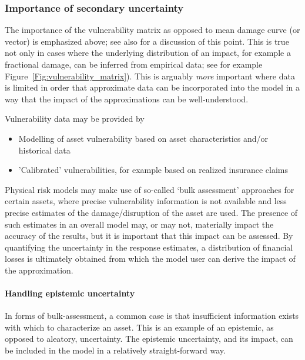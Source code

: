 \documentclass[a4paper,11pt]{extarticle} %
\begin{document}
\subsubsection{Importance of secondary uncertainty}
The importance of the vulnerability matrix as opposed to mean damage curve (or vector) is emphasized above; see also \cite{Taylor:2015} for a discussion of this point. This is true not only in cases where the underlying distribution of an impact, for example a fractional damage, can be inferred from empirical data; see for example Figure~\ref{Fig:vulnerability_matrix}). This is arguably \emph{more} important where data is limited in order that approximate data can be incorporated into the model in a way that the impact of the approximations can be well-understood. 

Vulnerability data may be provided by
\begin{itemize}
	\item Modelling of asset vulnerability based on asset characteristics and/or historical data
	\item 'Calibrated' vulnerabilities, for example based on realized insurance claims
\end{itemize}
Physical risk models may make use of so-called `bulk assessment' approaches for certain assets, where precise vulnerability information is not available and less precise estimates of the damage/disruption of the asset are used. The presence of such estimates in an overall model may, or may not, materially impact the accuracy of the results, but it is important that this impact can be assessed. By quantifying the uncertainty in the response estimates, a distribution of financial losses is ultimately obtained from which the model user can derive the impact of the approximation.

\paragraph{Handling epistemic uncertainty}
In forms of bulk-assessment, a common case is that insufficient information exists with which to characterize an asset. This is an example of an epistemic, as opposed to aleatory, uncertainty. The epistemic uncertainty, and its impact, can be included in the model in a relatively straight-forward way.
\end{document}
